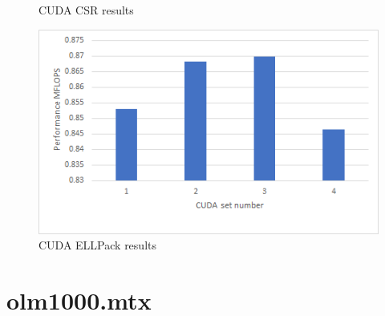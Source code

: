 \documentclass{scrreprt}
\begin{document}
\begin{figure}[ht]
\begin{minipage}[b]{0.5\linewidth}
    \caption{CUDA CSR results} 
    \vspace{4ex}
  \end{minipage}%
  \begin{minipage}[b]{0.5\linewidth}
    \centering
    \includegraphics[width=.9\linewidth]{adderELLCUDA.png} 
    \caption{CUDA ELLPack  results} 
    \vspace{4ex}
  \end{minipage} 
\end{figure}
\FloatBarrier


\section{olm1000.mtx}
\end{document}
